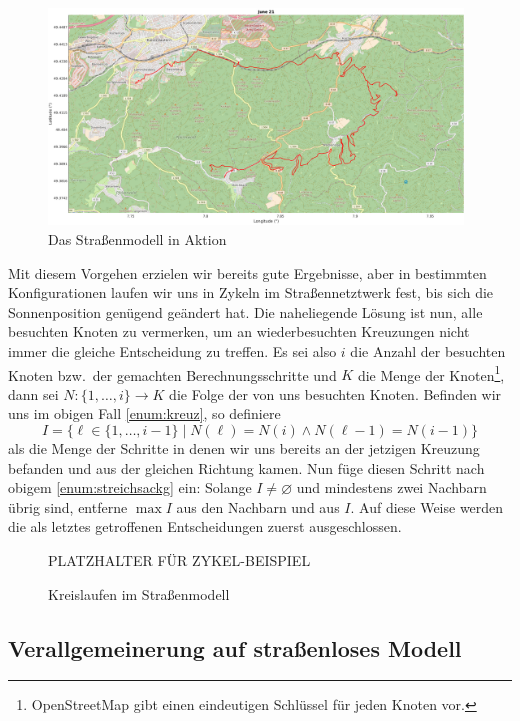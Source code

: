 \documentclass[
    paper=a4,
    DIV14,
    fontsize=12pt,
    pagesize=pdftex,
    toc=bibliographynumbered
]{scrartcl}
\numberwithin{figure}{section}
\numberwithin{equation}{section}
\numberwithin{table}{section}
\begin{document}
\begin{figure}[htb]
    \centering
    \includegraphics[width=0.98\textwidth]{images/tukl_strasse_gross.png}
    \caption{Das Straßenmodell in Aktion}
    \label{fig:osmmod}
\end{figure}

Mit diesem Vorgehen erzielen wir bereits gute Ergebnisse, aber in bestimmten
Konfigurationen laufen wir uns in Zykeln im Straßennetztwerk fest, bis sich die
Sonnenposition genügend geändert hat. Die naheliegende Lösung ist nun, alle besuchten
Knoten zu vermerken, um an wiederbesuchten Kreuzungen nicht immer die gleiche Entscheidung
zu treffen. Es sei also $i$ die Anzahl der besuchten Knoten bzw.\ der gemachten
Berechnungsschritte und $K$ die Menge der Knoten\footnote{OpenStreetMap gibt einen
eindeutigen Schlüssel für jeden Knoten vor.}, dann sei $N:\{1, \dots, i\} \to K$ die Folge
der von uns besuchten Knoten. Befinden wir uns im obigen Fall \ref{enum:kreuz}, so
definiere
\begin{equation*}
    I = \bigl\{ \ell \in \{1, \dots, i-1\} \mid
    N(\ell) = N(i) \wedge N(\ell-1) = N(i-1) \bigr\}
\end{equation*}
als die Menge der Schritte in denen wir uns bereits an der jetzigen Kreuzung befanden und
aus der gleichen Richtung kamen. Nun füge diesen Schritt nach obigem
\ref{enum:streichsackg} ein: Solange $I\neq\varnothing$ und mindestens zwei Nachbarn übrig
sind, entferne $\max I$ aus den Nachbarn und aus $I$. Auf diese Weise werden die als
letztes getroffenen Entscheidungen zuerst ausgeschlossen.

\begin{figure}[htb]
    \centering
    PLATZHALTER FÜR ZYKEL-BEISPIEL
    \caption{Kreislaufen im Straßenmodell}
    \label{fig:osmzyk}
\end{figure}

\subsection{Verallgemeinerung auf straßenloses Modell}
\end{document}
